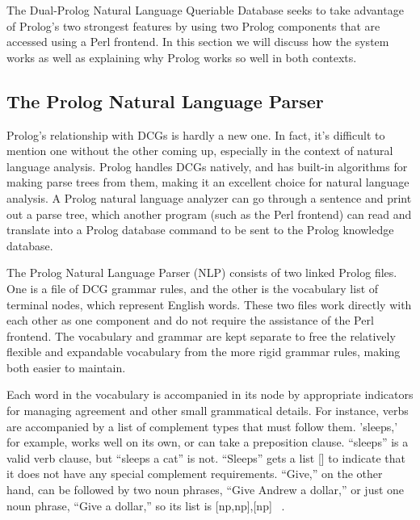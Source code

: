 \documentclass[12pt]{article}
\begin{document}
The Dual-Prolog Natural Language Queriable Database seeks to take advantage of Prolog's two strongest features by using two Prolog components that are accessed using a Perl frontend. In this section we will discuss how the system works as well as explaining why Prolog works so well in both contexts.

\subsection*{The Prolog Natural Language Parser}

Prolog's relationship with DCGs is hardly a new one. In fact, it's difficult to mention one without the other coming up, especially in the context of natural language analysis. Prolog handles DCGs natively, and has built-in algorithms for making parse trees from them, making it an excellent choice for natural language analysis. A Prolog natural language analyzer can go through a sentence and print out a parse tree, which another program (such as the Perl frontend) can read and translate into a Prolog database command to be sent to the Prolog knowledge database.

The Prolog Natural Language Parser (NLP) consists of two linked Prolog files. One is a file of DCG grammar rules, and the other is the vocabulary list of terminal nodes, which represent English words. These two files work directly with each other as one component and do not require the assistance of the Perl frontend. The vocabulary and grammar are kept separate to free the relatively flexible and expandable vocabulary from the more rigid grammar rules, making both easier to maintain.

Each word in the vocabulary is accompanied in its node by appropriate indicators for managing agreement and other small grammatical details. For instance, verbs are accompanied by a list of complement types that must follow them. 'sleeps,' for example, works well on its own, or can take a preposition clause. ``sleeps'' is a valid verb clause, but ``sleeps a cat'' is not. ``Sleeps'' gets a list [] to indicate that it does not have any special complement requirements. ``Give,'' on the other hand, can be followed by two noun phrases, ``Give Andrew a dollar,'' or just one noun phrase, ``Give a dollar,'' so its list is [np,np],[np] ~\citep{PS}. 
\end{document}
